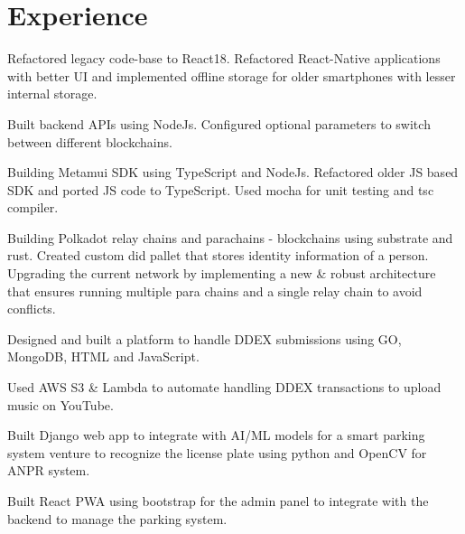 \documentclass[]{assets/deedy-resume-openfont}
\begin{document}
  \section{Experience}
  \hfill {}
      \begin{tightemize}
       \item Refactored legacy code-base to React18. Refactored React-Native applications with better UI and implemented offline storage for older smartphones with lesser internal storage.
       \item Built backend APIs using NodeJs. Configured optional parameters to switch between different blockchains.
       \item Building Metamui SDK using TypeScript and NodeJs. Refactored older JS based SDK and ported JS code to TypeScript. Used mocha for unit testing and tsc compiler.
       \item Building Polkadot relay chains and parachains - blockchains using substrate and rust. Created custom did pallet that stores identity information of a person. Upgrading the current network by implementing a new \& robust architecture that ensures running multiple para chains and a single relay chain to avoid conflicts.

      \end{tightemize}
      \sectionsep
  \hfill {}
      \begin{tightemize}
\item Designed and built a platform to handle DDEX submissions using GO, MongoDB, HTML and JavaScript.
\item  Used AWS S3 \& Lambda to automate handling DDEX transactions to upload music on YouTube. 
\end{tightemize}
      \sectionsep
  \hfill {}
      \begin{tightemize}
\item Built Django web app to integrate with AI/ML models for a smart parking system venture to recognize the license plate using python and OpenCV for ANPR system. 
\item Built React PWA using bootstrap for the admin panel to integrate with the backend to manage the parking system.
\end{tightemize}
      \sectionsep
%
%
\end{document}
